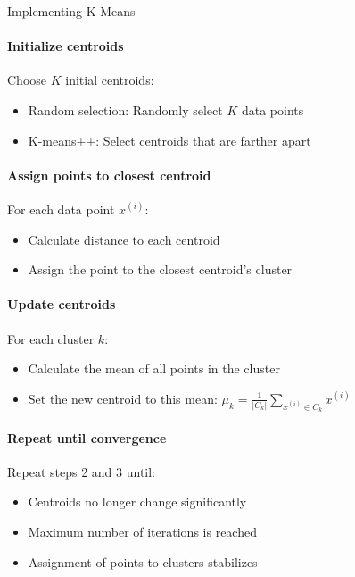 \begin{KR}{Implementing K-Means}\\
\paragraph{Initialize centroids}
Choose $K$ initial centroids:
\begin{itemize}
    \item Random selection: Randomly select $K$ data points
    \item K-means++: Select centroids that are farther apart
\end{itemize}

\paragraph{Assign points to closest centroid}
For each data point $x^{(i)}$:
\begin{itemize}
    \item Calculate distance to each centroid
    \item Assign the point to the closest centroid's cluster
\end{itemize}

\paragraph{Update centroids}
For each cluster $k$:
\begin{itemize}
    \item Calculate the mean of all points in the cluster
    \item Set the new centroid to this mean: $\mu_k = \frac{1}{|C_k|} \sum_{x^{(i)} \in C_k} x^{(i)}$
\end{itemize}

\paragraph{Repeat until convergence}
Repeat steps 2 and 3 until:
\begin{itemize}
    \item Centroids no longer change significantly
    \item Maximum number of iterations is reached
    \item Assignment of points to clusters stabilizes
\end{itemize}
\end{KR}

